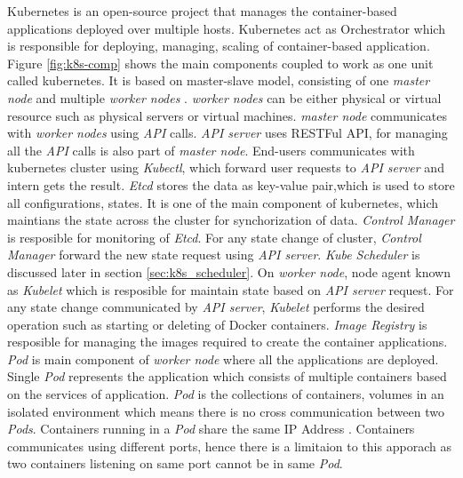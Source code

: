 Kubernetes is an open-source project that manages the container-based applications deployed over multiple hosts. Kubernetes act as Orchestrator which is responsible for deploying, managing, scaling of container-based application\cite{kubernetes-github-repo}. Figure \ref{fig:k8s-comp} shows the main components coupled to work as one unit called kubernetes. It is based on master-slave model, consisting of one \emph{master node} and multiple \emph{worker nodes} \cite{Santos2019}. \emph{worker nodes} can be either physical or virtual resource such as physical servers or virtual machines. \emph{master node} communicates with \emph{worker nodes} using \emph{API} calls. \emph{API server} uses RESTFul API, for managing all the \emph{API} calls is also part of \emph{master node}. End-users communicates with kubernetes cluster using \emph{Kubectl}, which forward user requests to \emph{API server} and intern gets the result. \emph{Etcd} stores the data as key-value pair,which is used to store all configurations, states. It is one of the main component of kubernetes, which maintians the state across the cluster for synchorization of data. \emph{Control Manager} is resposible for monitoring of \emph{Etcd}. For any state change of cluster, \emph{Control Manager} forward the new state request using \emph{API server}. \emph{Kube Scheduler} is discussed later in section \ref{sec:k8s_scheduler}. On \emph{worker node}, node agent known as \emph{Kubelet} which is resposible for maintain state based on \emph{API server} request. For any state change communicated by \emph{API server}, \emph{Kubelet} performs the desired operation such as starting or deleting of Docker containers. \emph{Image Registry} is resposible for managing the images required to create the container applications. \emph{Pod} is main component of \emph{worker node} where all the applications are deployed. Single \emph{Pod} represents the application which consists of multiple containers based on the services of application. \emph{Pod} is the collections of containers, volumes in an isolated environment which means there is no cross communication between two \emph{Pods}. Containers running in a \emph{Pod} share the same IP Address \cite{Santos2019}. Containers communicates using different ports, hence there is a limitaion to this apporach as two containers listening on same port cannot be in same \emph{Pod}\cite{Santos2019}.
